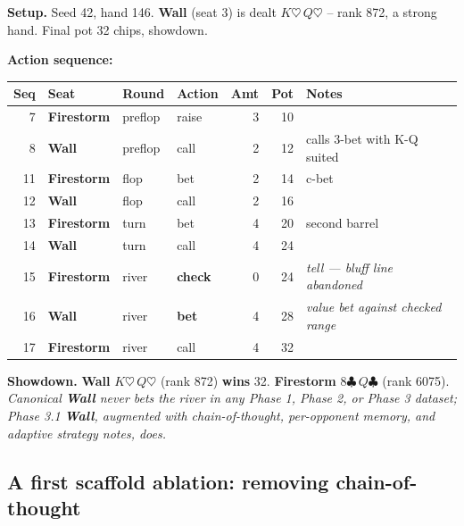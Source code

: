 \documentclass[10pt,twocolumn,letterpaper]{article}
\newcommand{\arch}[1]{\textbf{#1}}
\begin{document}
\begin{tcolorbox}[storyhand={Box~2.\quad The inversion in a single hand (Phase 3.1 hand \#146, 17 actions, 32-chip pot)}]
\scriptsize
\textbf{Setup.} Seed 42, hand 146. \arch{Wall} (seat 3) is dealt
$K\heartsuit\,Q\heartsuit$ -- rank 872, a strong hand. Final pot
32 chips, showdown.

\smallskip
\noindent\textbf{Action sequence:}\par\nopagebreak
\begin{center}
\setlength{\tabcolsep}{3pt}\begin{tabularx}{\linewidth}{@{}rlllrr>{\raggedright\arraybackslash}X@{}}
\toprule
Seq & Seat & Round & Action & Amt & Pot & Notes \\
\midrule
 7 & \arch{Firestorm} & preflop & raise          & 3 & 10 &  \\
 8 & \arch{Wall}      & preflop & call           & 2 & 12 & calls 3-bet with K-Q suited \\
11 & \arch{Firestorm} & flop    & bet            & 2 & 14 & c-bet \\
12 & \arch{Wall}      & flop    & call           & 2 & 16 &  \\
13 & \arch{Firestorm} & turn    & bet            & 4 & 20 & second barrel \\
14 & \arch{Wall}      & turn    & call           & 4 & 24 &  \\
15 & \arch{Firestorm} & river   & \textbf{check} & 0 & 24 & \textit{tell --- bluff line abandoned} \\
16 & \arch{Wall}      & river   & \textbf{bet}   & 4 & 28 & \textit{value bet against checked range} \\
17 & \arch{Firestorm} & river   & call           & 4 & 32 &  \\
\bottomrule
\end{tabularx}
\end{center}

\smallskip
\noindent\textbf{Showdown.}
\arch{Wall} $K\heartsuit\,Q\heartsuit$ (rank 872) \textbf{wins} 32.
\arch{Firestorm} $8\clubsuit\,Q\clubsuit$ (rank 6075).
\textit{Canonical \arch{Wall} never bets the river in any Phase 1,
Phase 2, or Phase 3 dataset; Phase 3.1 \arch{Wall}, augmented with
chain-of-thought, per-opponent memory, and adaptive strategy
notes, does.}
\end{tcolorbox}


\subsection{A first scaffold ablation: removing chain-of-thought}
\end{document}
